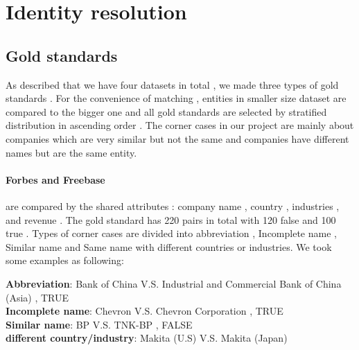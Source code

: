 \section{Identity resolution}
\subsection{Gold standards}
As described that we have four datasets in total , we made three types of gold standards . For the convenience of matching , entities in smaller size dataset are compared to the bigger one and all gold standards are selected by stratified distribution in ascending order . The corner cases in our project are mainly about companies which are very similar but not the same and companies have different names but are the same entity.

\paragraph{Forbes and Freebase} are compared by the shared attributes : company name , country , industries , and revenue . The gold standard has 220 pairs in total with 120 false and 100 true . Types of corner cases are divided into abbreviation , Incomplete name , Similar name and Same name with different countries or industries. We took some examples as following:

\textbf{Abbreviation}: Bank of China V.S. Industrial and Commercial Bank of China (Asia) , TRUE \\
\textbf{Incomplete name}: Chevron V.S. Chevron Corporation , TRUE  \\
\textbf{Similar name}: BP V.S. TNK-BP , FALSE \\
\textbf{different country/industry}: Makita (U.S) V.S. Makita (Japan) \\

